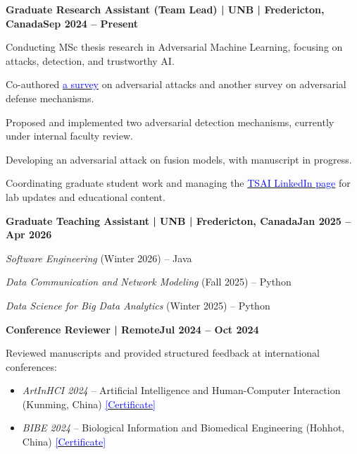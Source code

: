 \documentclass[letterpaper,10pt]{article}
\newcommand{\heading}[2]{
  \hspace{10pt}#1\hfill#2\\
}
\newcommand{\headingBf}[2]{
  \heading{\textbf{#1}}{\textbf{#2}}
}
\newenvironment{resume_list}{
  \vspace{-7pt}
  \begin{itemize}[itemsep=-2px, parsep=1pt, leftmargin=30pt]
}{
  \end{itemize}
}
\begin{document}
\headingBf{Graduate Research Assistant (Team Lead) | UNB | Fredericton, Canada}{Sep 2024 -- Present}
\begin{resume_list}
  \item Conducting MSc thesis research in Adversarial Machine Learning, focusing on attacks, detection, and trustworthy AI.
  \item Co-authored \href{https://www.techrxiv.org/doi/full/10.36227/techrxiv.177272853.30003431/v1}{\textcolor{blue}{a survey}} on adversarial attacks and another survey on adversarial defense mechanisms.
  \item Proposed and implemented two adversarial detection mechanisms, currently under internal faculty review.
  \item Developing an adversarial attack on fusion models, with manuscript in progress.
  \item Coordinating graduate student work and managing the \href{https://www.linkedin.com/company/trustworthy-and-secure-ai-tsai-lab/?viewAsMember=true}{\textcolor{blue}{TSAI LinkedIn page}} for lab updates and educational content.
\end{resume_list}


\headingBf{Graduate Teaching Assistant | UNB | Fredericton, Canada}{Jan 2025 -- Apr 2026}
\begin{resume_list}
      \item \textit{Software Engineering} (Winter 2026) -- Java
      \item \textit{Data Communication and Network Modeling} (Fall 2025) -- Python
      \item \textit{Data Science for Big Data Analytics} (Winter 2025) -- Python
\end{resume_list}


\headingBf{Conference Reviewer | Remote}{Jul 2024 -- Oct 2024}
\begin{resume_list}
    \item Reviewed manuscripts and provided structured feedback at international conferences:
          \begin{itemize}[itemsep=-2px, leftmargin=20pt]
              \item \textit{ArtInHCI 2024} -- Artificial Intelligence and Human-Computer Interaction (Kunming, China) 
              \href{https://drive.google.com/file/d/18Jl1Mu6-fi-272sEjHUOpTdb3qWVf0DJ/view?usp=drive_link}{\textcolor{blue}{[Certificate]}}
              \item \textit{BIBE 2024} -- Biological Information and Biomedical Engineering (Hohhot, China) 
              \href{https://drive.google.com/file/d/1qcew0MJE69DjEmTelrJihG1ffeAVpHj7/view?usp=drive_link}{\textcolor{blue}{[Certificate]}}
          \end{itemize}
\end{resume_list}
\end{document}
